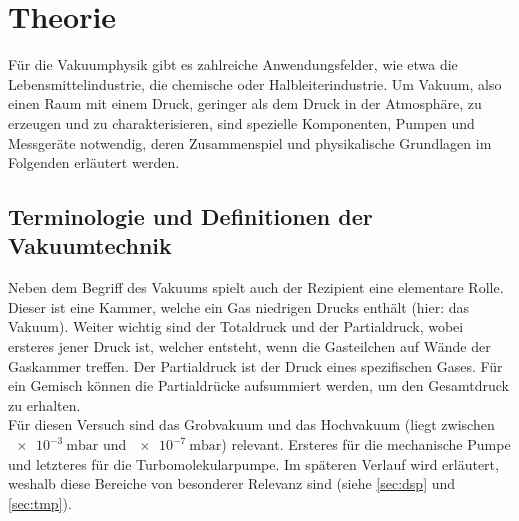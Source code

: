 \section{Theorie}
\label{sec:Theorie}

Für die Vakuumphysik gibt es zahlreiche Anwendungsfelder, wie etwa die 
Lebensmittelindustrie, die chemische oder Halbleiterindustrie. Um Vakuum, 
also einen Raum mit einem Druck, geringer als dem Druck in der Atmosphäre, zu 
erzeugen und zu charakterisieren, sind spezielle Komponenten, Pumpen und
Messgeräte notwendig, deren Zusammenspiel und physikalische Grundlagen im
Folgenden erläutert werden. \cite{glossar}

\subsection{Terminologie und Definitionen der Vakuumtechnik}
Neben dem Begriff des Vakuums spielt auch der Rezipient eine elementare Rolle. 
Dieser ist eine Kammer, welche ein Gas niedrigen Drucks enthält (hier:
das Vakuum). Weiter wichtig sind der Totaldruck und der Partialdruck, wobei 
ersteres jener Druck ist, welcher entsteht, wenn die Gasteilchen auf Wände der 
Gaskammer treffen. Der Partialdruck ist der Druck eines spezifischen Gases. Für 
ein Gemisch können die Partialdrücke aufsummiert werden, um den Gesamtdruck zu 
erhalten.
\\
Für diesen Versuch sind das Grobvakuum und das Hochvakuum (liegt zwischen 
$\qty{e-3}{\milli\bar}$ und $\qty{e-7}{\milli\bar}$) relevant. Ersteres 
für die mechanische Pumpe und letzteres für die Turbomolekularpumpe. Im späteren 
Verlauf wird erläutert, weshalb diese Bereiche von besonderer Relevanz sind 
(siehe \autoref{sec:dsp} und \autoref{sec:tmp}).
